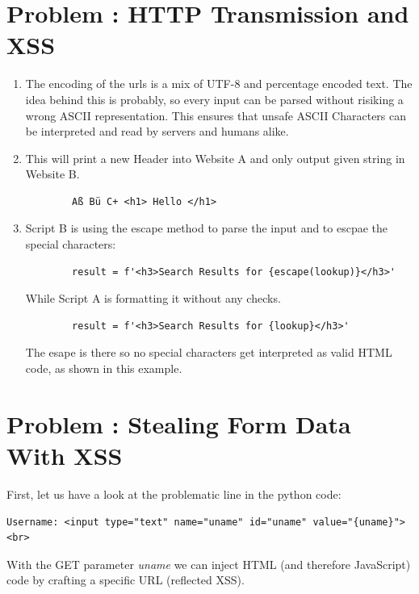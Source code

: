 \documentclass[12pt]{scrartcl}
\newcounter{exnum}
\newcommand{\exercise}[1]{\section*{Problem \theexnum\stepcounter{exnum}: #1}}
\begin{document}
\setcounter{exnum}{1}
\exercise{HTTP Transmission and XSS}
\begin{enumerate}[label=\arabic*]
  \item
    The encoding of the urls is a mix of UTF-8 and percentage encoded text.
    The idea behind this is probably, so every input can be parsed without risiking a wrong ASCII representation. This ensures that unsafe ASCII Characters can be interpreted and read by servers and humans
    alike.

  \item
    This will print a new Header into Website A and only output given string in Website B.
      \begin{lstlisting}
        Aß Bü C+ <h1> Hello </h1>
      \end{lstlisting}

  \item
    Script B is using the escape method to parse the input and to escpae the special characters:
      \begin{lstlisting}
        result = f'<h3>Search Results for {escape(lookup)}</h3>'
      \end{lstlisting}
    While Script A is formatting it without any checks.
      \begin{lstlisting}
        result = f'<h3>Search Results for {lookup}</h3>'
      \end{lstlisting}
    The esape is there so no special characters get interpreted as valid HTML code, as shown in this example.

\end{enumerate}

\setcounter{exnum}{2}
\exercise{Stealing Form Data With XSS}

First, let us have a look at the problematic line in the python code:
\begin{lstlisting}
Username: <input type="text" name="uname" id="uname" value="{uname}"><br>
\end{lstlisting}
With the GET parameter \textit{uname} we can inject HTML (and therefore JavaScript) code by crafting a specific URL (reflected XSS).
\end{document}
